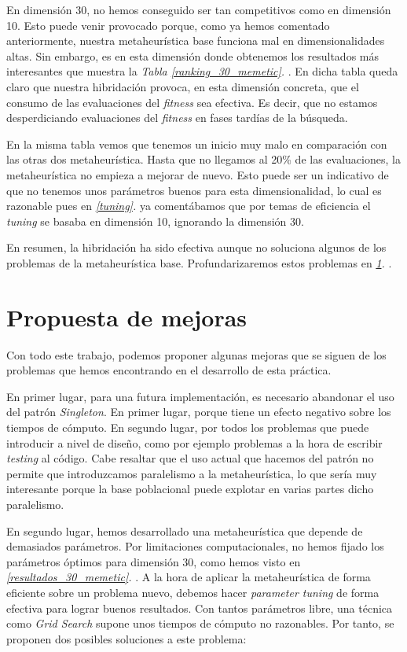 \documentclass[11pt]{article}
\begin{document}
En dimensión 30, no hemos conseguido ser tan competitivos como en dimensión 10. Esto puede venir provocado porque, como ya hemos comentado anteriormente, nuestra metaheurística base funciona mal en dimensionalidades altas. Sin embargo, es en esta dimensión donde obtenemos los resultados más interesantes que muestra la \emph{Tabla \ref{ranking_30_memetic}. }. En dicha tabla queda claro que nuestra hibridación provoca, en esta dimensión concreta, que el consumo de las evaluaciones del \emph{fitness} sea efectiva. Es decir, que no estamos desperdiciando evaluaciones del \emph{fitness} en fases tardías de la búsqueda.

En la misma tabla vemos que tenemos un inicio muy malo en comparación con las otras dos metaheurística. Hasta que no llegamos al 20\% de las evaluaciones, la metaheurística no empieza a mejorar de nuevo. Esto puede ser un indicativo de que no tenemos unos parámetros buenos para esta dimensionalidad, lo cual es razonable pues en \emph{\ref{tuning}. } ya comentábamos que por temas de eficiencia el \emph{tuning} se basaba en dimensión 10, ignorando la dimensión 30.

En resumen, la hibridación ha sido efectiva aunque no soluciona algunos de los problemas de la metaheurística base. Profundarizaremos estos problemas en \emph{\ref{mejoras}. }.

\pagebreak
\section{Propuesta de mejoras} \label{mejoras}

Con todo este trabajo, podemos proponer algunas mejoras que se siguen de los problemas que hemos encontrando en el desarrollo de esta práctica.

En primer lugar, para una futura implementación, es necesario abandonar el uso del patrón \emph{Singleton}. En primer lugar, porque tiene un efecto negativo sobre los tiempos de cómputo. En segundo lugar, por todos los problemas que puede introducir a nivel de diseño, como por ejemplo problemas a la hora de escribir \emph{testing} al código. Cabe resaltar que el uso actual que hacemos del patrón no permite que introduzcamos paralelismo a la metaheurística, lo que sería muy interesante porque la base poblacional puede explotar en varias partes dicho paralelismo.

En segundo lugar, hemos desarrollado una metaheurística que depende de demasiados parámetros. Por limitaciones computacionales, no hemos fijado los parámetros óptimos para dimensión 30, como hemos visto en \emph{\ref{resultados_30_memetic}. }. A la hora de aplicar la metaheurística de forma eficiente sobre un problema nuevo, debemos hacer \emph{parameter tuning} de forma efectiva para lograr buenos resultados. Con tantos parámetros libre, una técnica como \emph{Grid Search} supone unos tiempos de cómputo no razonables. Por tanto, se proponen dos posibles soluciones a este problema:
\end{document}
